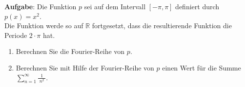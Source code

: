 \documentclass{article}
\newcommand{\bruch}[2]{\displaystyle\frac{\;\displaystyle#1\;}{\;\displaystyle#2\;}}
\begin{document}
\pagebreak

\noindent
\textbf{Aufgabe}:
Die Funktion $p$ sei auf dem Intervall $[-\pi,\pi]$ definiert durch
\\[0.1cm]
\hspace*{1.3cm}
$p(x) = x^2$.
\\[0.1cm]
Die Funktion werde so auf $\mathbb{R}$ fortgesetzt, dass die resultierende Funktion die Periode
$2\!\cdot\!\pi$ hat.  
\begin{enumerate}
\item Berechnen Sie die Fourier-Reihe von $p$.
\item Berechnen Sie mit Hilfe der Fourier-Reihe von $p$ einen Wert f\"ur die Summe
      \\[0.1cm]
      \hspace*{1.3cm}
      $\displaystyle \sum\limits_{n=1}^\infty \bruch{1}{n^2}$. 
\end{enumerate}
\end{document}
